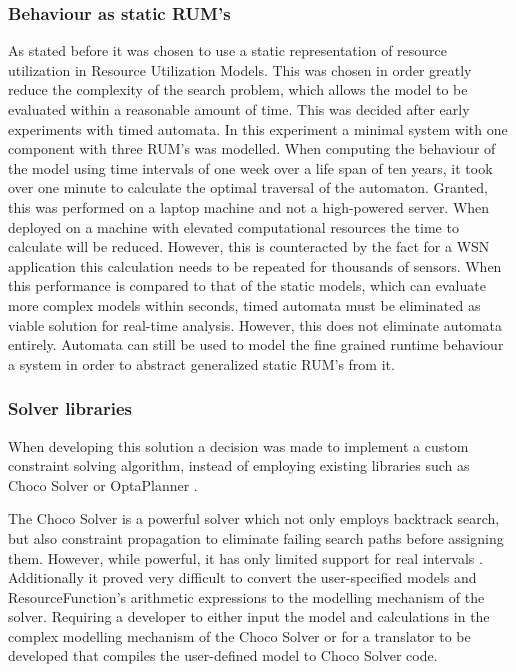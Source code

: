 \subsubsection{Behaviour as static RUM's}
As stated before it was chosen to use a static representation of resource utilization in Resource Utilization Models. This was chosen in order greatly reduce the complexity of the search problem, which allows the model to be evaluated within a reasonable amount of time. This was decided after early experiments with timed automata. In this experiment a minimal system with one component with three RUM's was modelled. When computing the behaviour of the model using time intervals of one week over a life span of ten years, it took over one minute to calculate the optimal traversal of the automaton. Granted, this was performed on a laptop machine and not a high-powered server. When deployed on a machine with elevated computational resources the time to calculate will be reduced. However, this is counteracted by the fact for a WSN application this calculation needs to be repeated for thousands of sensors. When this performance is compared to that of the static models, which can evaluate more complex models within seconds, timed automata must be eliminated as viable solution for real-time analysis. However, this does not eliminate automata entirely. Automata can still be used to model the fine grained runtime behaviour a system in order to abstract generalized static RUM's from it.

\subsubsection{Solver libraries}
When developing this solution a decision was made to implement a custom constraint solving algorithm, instead of employing existing libraries such as Choco Solver \cite{web:choco} or OptaPlanner \cite{web:opta}. 

The Choco Solver is a powerful solver which not only employs backtrack search, but also constraint propagation to eliminate failing search paths before assigning them. However, while powerful, it has only limited support for real intervals \cite{choco_ibex}. Additionally it proved very difficult to convert the user-specified models and ResourceFunction's arithmetic expressions to the modelling mechanism of the solver. Requiring a developer to either input the model and calculations in the complex modelling mechanism of the Choco Solver or for a translator to be developed that compiles the user-defined model to Choco Solver code.

